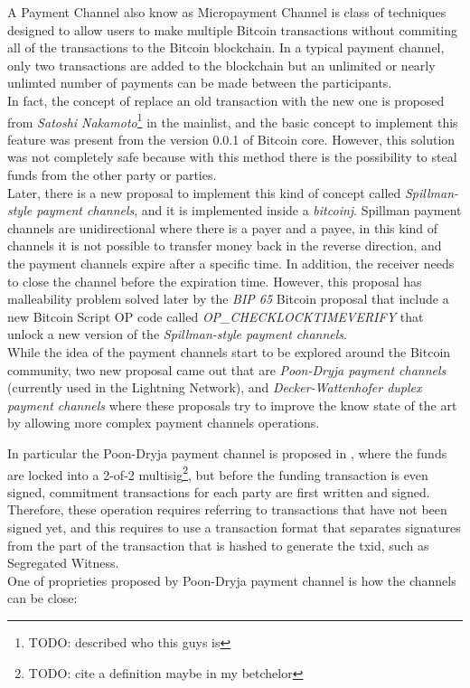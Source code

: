 A Payment Channel also know as Micropayment Channel is class of techniques designed to allow users to make multiple
Bitcoin transactions without commiting all of the transactions to the Bitcoin blockchain. In a typical payment channel,
only two transactions are added to the blockchain but an unlimited or nearly unlimted number of payments
can be made between the participants.\\
In fact, the concept of replace an old transaction with the new one is proposed from \emph{Satoshi Nakamoto}\footnote{TODO: described who this guys is} in the mainlist\cite{payment-channels-satoshi}, and
the basic concept to implement this feature was present from the version 0.0.1 of Bitcoin core. However, this solution
was not completely safe because with this method there is the possibility to steal funds from the other party or parties.\\

Later, there is a new proposal to implement this kind of concept called \emph{Spillman-style payment channels}, and it is
implemented inside a \emph{bitcoinj}\cite{bitcoinj-impl}. Spillman payment channels are unidirectional where
there is a payer and a payee, in this kind of channels it is not possible to transfer money back in the reverse direction, and the payment
channels expire after a specific time.
In addition, the receiver needs to close the channel before the expiration time.
However, this proposal has malleability problem solved later by the \emph{BIP  65}\cite{bip65} Bitcoin proposal that include a new Bitcoin Script OP code
called \emph{OP\_CHECKLOCKTIMEVERIFY} that unlock a new version of the \emph{Spillman-style payment channels}.\\
While the idea of the payment channels start to be explored around the Bitcoin community, two new proposal came out that are
\emph{Poon-Dryja payment channels}\cite{lightning-network-paper} (currently used in the Lightning Network),
and \emph{Decker-Wattenhofer duplex payment channels}\cite{Decker2015fast} where these proposals try to improve the know state
of the art by allowing more complex payment channels operations.

In particular the Poon-Dryja payment channel is proposed in \cite{lightning-network-paper}, where
the funds are locked into a 2-of-2 multisig\footnote{TODO: cite a definition maybe in my betchelor},
but before the funding transaction is even signed, commitment transactions for each party are first written and signed.\\
Therefore, these operation requires referring to transactions that have not been signed yet, and this requires to use a transaction
format that separates signatures from the part of the transaction that is hashed to generate the txid, such as Segregated Witness.\\
One of proprieties proposed by Poon-Dryja payment channel is how the channels can be close:

